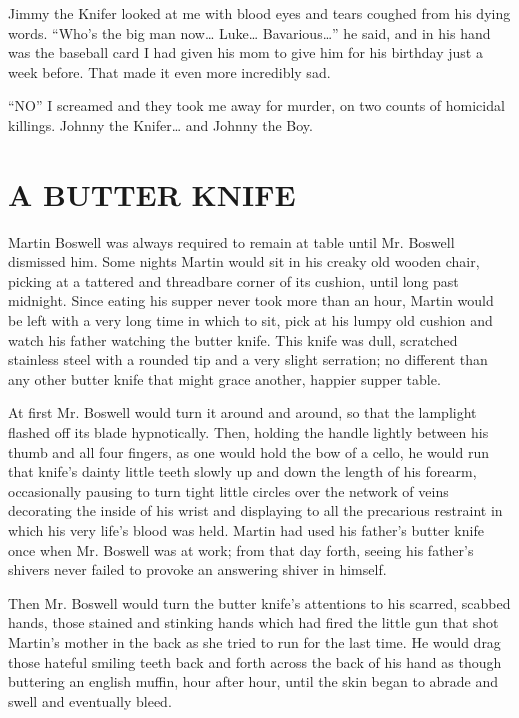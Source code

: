 Jimmy the Knifer looked at me with blood eyes and tears coughed
from his dying words. ``Who's the big man now{\ldots} Luke{\ldots}
Bavarious{\ldots}'' he said, and in his hand was the baseball card I had
given his mom to give him for his birthday just a week before. That
made it even more incredibly sad.



``NO'' I screamed and they took me away for murder, on two counts of
homicidal killings. Johnny the Knifer{\ldots} and Johnny the Boy. 

 





\chapter{A BUTTER KNIFE}





Martin Boswell was always required to remain at table until Mr.
Boswell dismissed him. Some nights Martin would sit in his creaky
old wooden chair, picking at a tattered and threadbare corner of
its cushion, until long past midnight. Since eating his supper
never took more than an hour, Martin would be left with a very long
time in which to sit, pick at his lumpy old cushion and watch his
father watching the butter knife. This knife was dull, scratched
stainless steel with a rounded tip and a very slight serration; no
different than any other butter knife that might grace another,
happier supper table.



At first Mr. Boswell would turn it around and around, so that the
lamplight flashed off its blade hypnotically. Then, holding the
handle lightly between his thumb and all four fingers, as one would
hold the bow of a cello, he would run that knife's dainty little
teeth slowly up and down the length of his forearm, occasionally
pausing to turn tight little circles over the network of veins
decorating the inside of his wrist and displaying to all the
precarious restraint in which his very life's blood was held.
Martin had used his father's butter knife once when Mr. Boswell was
at work; from that day forth, seeing his father's shivers never
failed to provoke an answering shiver in himself.



Then Mr. Boswell would turn the butter knife's attentions to his
scarred, scabbed hands, those stained and stinking hands which had
fired the little gun that shot Martin's mother in the back as she
tried to run for the last time. He would drag those hateful smiling
teeth back and forth across the back of his hand as though
buttering an english muffin, hour after hour, until the skin began
to abrade and swell and eventually bleed.




